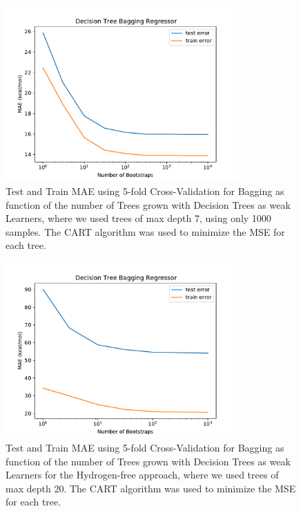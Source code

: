 \documentclass[11pt,a4paper,notitlepage]{article}
\begin{document}
\begin{figure}[H]
\centering
\includegraphics[width=0.8\textwidth]{bagging_2.pdf}
\caption[Bad Bagging]{Test and Train MAE using 5-fold Cross-Validation for Bagging as function of the number of Trees grown with Decision Trees as weak Learners, where we used trees of max depth 7, using only 1000 samples. The CART algorithm was used to minimize the MSE for each tree.} \label{fig:bagging_2}
\end{figure}
\begin{figure}[H]
\centering
\includegraphics[width=0.8\textwidth]{bagging_2noH.pdf}
\caption[Bagging, no H]{Test and Train MAE using 5-fold Cross-Validation for Bagging as function of the number of Trees grown with Decision Trees as weak Learners for the Hydrogen-free approach, where we used trees of max depth 20. The CART algorithm was used to minimize the MSE for each tree.} \label{fig:baggingnoH}
\end{figure}
\end{document}
